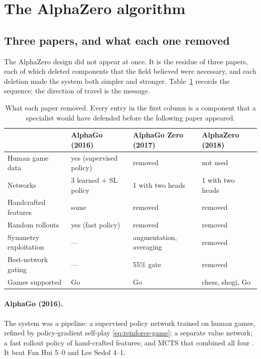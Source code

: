 \section{The AlphaZero algorithm}
\label{sec:alphazero}

\subsection{Three papers, and what each one removed}
\label{sec:three-papers}

The AlphaZero design did not appear at once. It is the residue of three papers,
each of which deleted components that the field believed were necessary, and each
deletion made the system both simpler and stronger. Table~\ref{tab:removals}
records the sequence; the direction of travel is the message.

\begin{table}[t]
\centering
\small
\caption{What each paper removed. Every entry in the first column is a component
that a specialist would have defended before the following paper appeared.}
\label{tab:removals}
\begin{tabularx}{\textwidth}{@{}l l l l@{}}
\toprule
& AlphaGo (2016) & AlphaGo Zero (2017) & AlphaZero (2018) \\
\midrule
Human game data      & yes (supervised policy) & removed & not used \\
Networks             & 3 learned $+$ SL policy  & 1 with two heads & 1 with two heads \\
Handcrafted features & some & removed & removed \\
Random rollouts      & yes (fast policy) & removed & removed \\
Symmetry exploitation & --- & augmentation, averaging & removed \\
Best-network gating  & --- & 55\% gate & removed \\
Games supported      & Go & Go & chess, shogi, Go \\
\bottomrule
\end{tabularx}
\end{table}

\paragraph{AlphaGo (2016).} The system was a pipeline: a supervised policy
network trained on human games, refined by policy-gradient self-play
\eqref{eq:reinforce-game}; a separate value network; a fast rollout policy of
hand-crafted features; and MCTS that combined all four
\citep{silver2016alphago}. It beat Fan Hui 5--0 and Lee Sedol 4--1.

